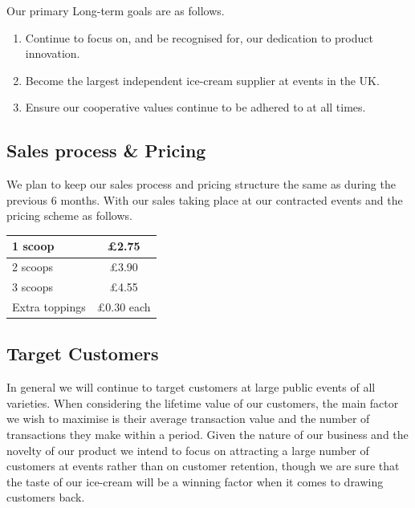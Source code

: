 \documentclass{article}
\begin{document}
  Our primary Long-term goals are as follows.
  \begin{enumerate}

    \item Continue to focus on, and be recognised for, our dedication to product innovation.

    \item Become the largest independent ice-cream supplier at events in the UK.

    \item Ensure our cooperative values continue to be adhered to at all times.
  \end{enumerate}

  \subsection{Sales process \& Pricing}

  We plan to keep our sales process and pricing structure the same as during the previous 6 months. With our sales taking place at our contracted events and the pricing scheme as follows.

\begin{center}
  \begin{tabular}{ | l | c | }
    \hline
    1 scoop & \pounds 2.75 \\[2ex] \hline
    2 scoops & \pounds 3.90 \\[2ex] \hline
    3 scoops & \pounds 4.55 \\[2ex] \hline
    Extra toppings & \pounds 0.30 each \\[2ex] \hline
  \end{tabular}
\end{center}

  \subsection{Target Customers}

  In general we will continue to target customers at large public events of all varieties. When considering the lifetime value of our customers, the main factor we wish to maximise is their average transaction value and the number of transactions they make within a period. Given the nature of our business and the novelty of our product we intend to focus on attracting a large number of customers at events rather than on customer retention, though we are sure that the taste of our ice-cream will be a winning factor when it comes to drawing customers back. \\
\end{document}
